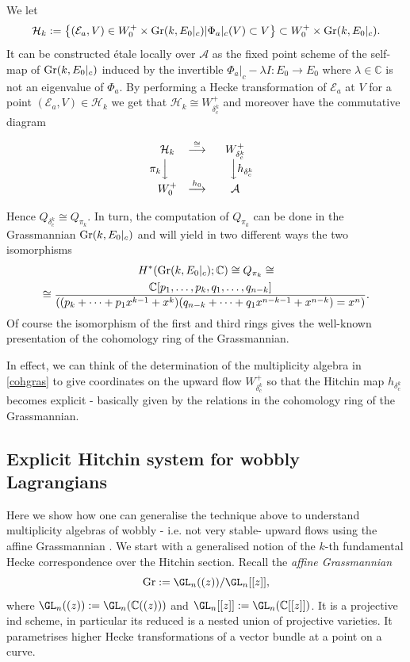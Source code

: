 \documentclass[12pt]{article}
\numberwithin{equation}{section}
\theoremstyle{remark}
\numberwithin{theorem}{section}
\def\beq{\begin{eqnarray}}
\def\eeq{\end{eqnarray}}
\def\calE{{\mathcal E}}
\def\C{\mathbb{C}}
\def\calA{{\mathcal{A}}}
\def\calH{\mathcal{H}}
\newcommand{\Gr}{\textnormal{Gr}}
\numberwithin{equation}{section}
\begin{document}
We let \beq  \label{fundamental}\calH_k:=\left\{ (\calE_a,V)\in W^+_0\times \Gr(k, E_0|_{c})| \Phi_a|_{c}(V)\subset V\right\}\subset W^+_0\times \Gr(k, E_0|_{c}).\eeq It can be constructed \'etale locally over $\calA$ as the fixed point scheme of the self-map of $\Gr(k,E_0|_{c})$ induced by the invertible $\Phi_a|_{c}-\lambda I :E_0\to E_0$ where $\lambda\in \C$ is not an eigenvalue of $\Phi_a$. By performing a Hecke transformation of $\calE_a$ at $V$ for a point $(\calE_a,V)\in \calH_k$  we get that  $\calH_k\cong W^+_{\delta^k_c}$ and moreover  have the commutative diagram 

$$  \begin{array}{ccc}\calH_k&\stackrel{\cong}{\longrightarrow}& W^+_{\delta^k_c}\\ \!\!\!\!\!\!\!\!\! \pi_k{\Big\downarrow} && \,\,\,\,\,\,\, {\Big\downarrow} h_{{\delta^k_c}} \\ W^+_0 &\stackrel{h_0}{\longrightarrow}& \calA \end{array}$$


Hence $Q_{\delta^k_c}\cong Q_{\pi_k}$. In turn, the computation of $Q_{\pi_k}$  can be done in the Grassmannian $\Gr(k, E_0|_{c})$ and will yield in two different ways the two isomorphisms  \begin{multline} \label{cohgras} H^*(\Gr(k, E_0|_{c});\C)\cong Q_{\pi_k}\cong  \\\cong \frac{\C[p_1,\dots,p_k,q_1,\dots,q_{n-k}]}{\left((p_k+\dots+p_1x^{k-1}+x^k)(q_{n-k}+\dots+q_1x^{n-k-1}+x^{n-k})=x^n\right)}.\end{multline} Of course the isomorphism of the first and third rings gives the well-known presentation of the cohomology ring of the Grassmannian. 

In effect, we can think of the determination of the multiplicity algebra in \eqref{cohgras} to give coordinates on the upward flow $W^+_{\delta^k_c}$ so that the Hitchin map $h_{{\delta^k_c}}$ becomes explicit - basically given by the relations in the cohomology ring of the Grassmannian.




\subsection{Explicit Hitchin system for wobbly Lagrangians}


Here we show how one can generalise the technique above to understand multiplicity algebras of wobbly - i.e. not very stable- upward flows using the affine Grassmannian \cite{gortz,zhu}. We  start with a generalised notion of the $k$-th fundamental Hecke correspondence over the Hitchin section. Recall the {\em affine Grassmannian} $$\Gr:=\GL_n((z))/\GL_n[[z]],$$ where $\GL_n((z)):=\GL_n(\C((z)))$ and $\GL_n[[z]]:=\GL_n(\C[[z]])$.  It is a projective ind scheme, in particular its reduced is a nested union of projective varieties. It parametrises higher Hecke transformations of a vector bundle at a point on a curve.
\end{document}
